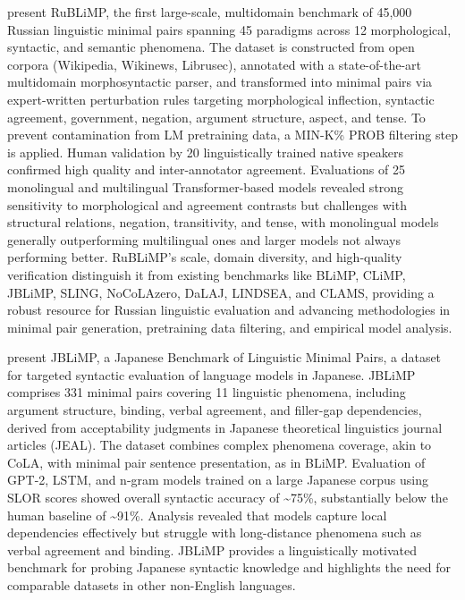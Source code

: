 \documentclass[acmsmall]{acmart}
\begin{document}
\citep{taktasheva-etal-2024-rublimp} present RuBLiMP, the first large-scale, multidomain benchmark of 45,000 Russian linguistic minimal pairs spanning 45 paradigms across 12 morphological, syntactic, and semantic phenomena. The dataset is constructed from open corpora (Wikipedia, Wikinews, Librusec), annotated with a state-of-the-art multidomain morphosyntactic parser, and transformed into minimal pairs via expert-written perturbation rules targeting morphological inflection, syntactic agreement, government, negation, argument structure, aspect, and tense. To prevent contamination from LM pretraining data, a MIN-K\% PROB filtering step is applied. Human validation by 20 linguistically trained native speakers confirmed high quality and inter-annotator agreement. Evaluations of 25 monolingual and multilingual Transformer-based models revealed strong sensitivity to morphological and agreement contrasts but challenges with structural relations, negation, transitivity, and tense, with monolingual models generally outperforming multilingual ones and larger models not always performing better. RuBLiMP’s scale, domain diversity, and high-quality verification distinguish it from existing benchmarks like BLiMP, CLiMP, JBLiMP, SLING, NoCoLAzero, DaLAJ, LINDSEA, and CLAMS, providing a robust resource for Russian linguistic evaluation and advancing methodologies in minimal pair generation, pretraining data filtering, and empirical model analysis.

\citep{someya-oseki-2023-jblimp}  present JBLiMP, a Japanese Benchmark of Linguistic Minimal Pairs, a dataset for targeted syntactic evaluation of language models in Japanese. JBLiMP comprises 331 minimal pairs covering 11 linguistic phenomena, including argument structure, binding, verbal agreement, and filler-gap dependencies, derived from acceptability judgments in Japanese theoretical linguistics journal articles (JEAL). The dataset combines complex phenomena coverage, akin to CoLA, with minimal pair sentence presentation, as in BLiMP. Evaluation of GPT-2, LSTM, and n-gram models trained on a large Japanese corpus using SLOR scores showed overall syntactic accuracy of \textasciitilde75\%, substantially below the human baseline of \textasciitilde91\%. Analysis revealed that models capture local dependencies effectively but struggle with long-distance phenomena such as verbal agreement and binding. JBLiMP provides a linguistically motivated benchmark for probing Japanese syntactic knowledge and highlights the need for comparable datasets in other non-English languages. 
\end{document}
